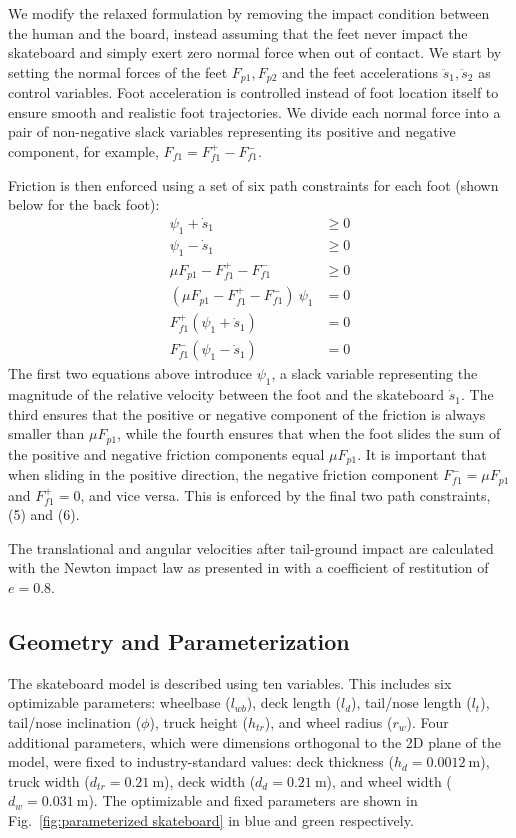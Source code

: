 \documentclass[default,iicol]{sn-jnl}
\begin{document}
We modify the relaxed formulation by removing the impact condition between the human and the board, instead assuming that the feet never impact the skateboard and simply exert zero normal force when out of contact.
We start by setting the normal forces of the feet $F_{p1}, F_{p2}$ and the feet accelerations $\ddot{s}_1, \ddot{s}_2$ as control variables.
Foot acceleration is controlled instead of foot location itself to ensure smooth and realistic foot trajectories.
We divide each normal force into a pair of non-negative slack variables representing its positive and negative component, for example, $F_{f1} = F_{f1}^+ - F_{f1}^-$.

Friction is then enforced using a set of six path constraints for each foot (shown below for the back foot):
\begin{align} \label{e_frictioncontrol}
    \psi_1 + \dot s_1  &\geq 0 \\
    \psi_1 - \dot s_1  &\geq 0 \\
    \mu F_{p1} - F_{f1}^+ - F_{f1}^- &\geq 0 \\
    (\mu F_{p1} - F_{f1}^+ - F_{f1}^-)\ \psi_1  &= 0 \\
    F_{f1}^+ (\psi_1 + \dot s_1)  &= 0 \\
    F_{f1}^- (\psi_1 - \dot s_1)  &= 0
\end{align}
The first two equations above introduce $\psi_1$, a slack variable representing the magnitude of the relative velocity between the foot and the skateboard $\dot{s}_1$. The third ensures that the positive or negative component of the friction is always smaller than $\mu F_{p1}$, while the fourth ensures that when the foot slides the sum of the positive and negative friction components equal $\mu F_{p1}$. It is important that when sliding in the positive direction, the negative friction component $F_{f1}^- = \mu F_{p1}$ and $F_{f1}^+=0$, and vice versa. This is enforced by the final two path constraints, (5) and (6).

The translational and angular velocities after tail-ground impact are calculated with the Newton impact law as presented in \citet{vallery_heike_advanced_2018} with a coefficient of restitution of $e=0.8$.

\subsection{Geometry and Parameterization}\label{s_paropt}
The skateboard model is described using ten variables. This includes six optimizable parameters: wheelbase ($l_{wb}$), deck length ($l_{d}$), tail/nose length ($l_{t}$), tail/nose inclination ($\phi$), truck height ($h_{tr}$), and wheel radius ($r_w$). Four additional parameters, which were dimensions orthogonal to the 2D plane of the model, were fixed to industry-standard values: deck thickness ($h_d = \SI{0.0012}{\meter}$), truck width ($d_{tr} = \SI{0.21}{\meter}$), deck width ($d_d = \SI{0.21}{\meter}$), and wheel width ($d_w = \SI{0.031}{\meter}$). The optimizable and fixed parameters are shown in Fig.~\ref{fig:parameterized skateboard} in blue and green respectively.
\end{document}
